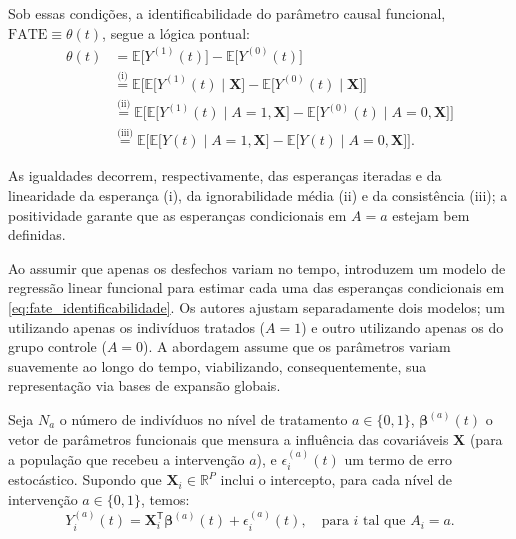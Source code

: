Sob essas condições, a identificabilidade do parâmetro causal funcional, \(\mathrm{FATE} \equiv \theta(t)\), segue a lógica pontual:
\begin{equation}
\begin{aligned}
    \theta(t)
    &= \mathbb{E}\big[Y^{(1)}(t)\big] - \mathbb{E}\big[Y^{(0)}(t)\big] \\
    &\overset{\text{(i)}}{=} \mathbb{E}\Big[\mathbb{E}\big[Y^{(1)}(t) \mid \mathbf{X}\big] - \mathbb{E}\big[Y^{(0)}(t) \mid \mathbf{X}\big]\Big] \\
    &\overset{\text{(ii)}}{=} \mathbb{E}\Big[\mathbb{E}\big[Y^{(1)}(t) \mid A = 1, \mathbf{X}\big] - \mathbb{E}\big[Y^{(0)}(t) \mid A = 0, \mathbf{X}\big]\Big] \\
    &\overset{\text{(iii)}}{=} \mathbb{E}\Big[\mathbb{E}\big[Y(t) \mid A = 1, \mathbf{X}\big] - \mathbb{E}\big[Y(t) \mid A = 0, \mathbf{X}\big]\Big].
    \label{eq:fate_identificabilidade}
\end{aligned}
\end{equation}

As igualdades decorrem, respectivamente, das esperanças iteradas e da linearidade da esperança (i), da ignorabilidade média (ii) e da consistência (iii); a positividade garante que as esperanças condicionais em \(A = a\) estejam bem definidas.

Ao assumir que apenas os desfechos variam no tempo,  introduzem um modelo de regressão linear funcional \cite{ramsay_functional_2005} para estimar cada uma das esperanças condicionais em \ref{eq:fate_identificabilidade}. 
Os autores ajustam separadamente dois modelos; um utilizando apenas os indivíduos tratados (\(A = 1\)) e outro utilizando apenas os do grupo controle (\(A = 0\)). 
A abordagem assume que os parâmetros variam suavemente ao longo do tempo, viabilizando, consequentemente, sua representação via bases de expansão globais. 

Seja \(N_a\) o número de indivíduos no nível de tratamento \(a \in \{0, 1\}\), \(\boldsymbol{\beta}^{(a)}(t)\) o vetor de parâmetros funcionais que mensura a influência das covariáveis \(\mathbf{X}\) (para a população que recebeu a intervenção \(a\)), e \(\epsilon_i^{(a)}(t)\) um termo de erro estocástico. 
Supondo que \(\mathbf{X}_i \in \mathbb{R}^{P}\) inclui o intercepto, para cada nível de intervenção \(a \in \{0, 1\}\), temos:
\begin{equation}
    Y_i^{(a)}(t) = \mathbf{X}_i^{\mathsf{T}}\boldsymbol{\beta}^{(a)}(t) + \epsilon_i^{(a)}(t), \quad \text{para } i \text{ tal que } A_i = a.
    \label{eq:ecker_modelo_regressao_funcional}
\end{equation}

